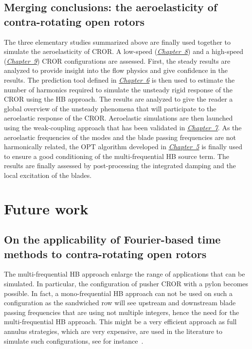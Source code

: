 \subsection*{Merging conclusions: the aeroelasticity of contra-rotating open rotors}

The three elementary studies summarized above 
are finally used together 
to simulate the aeroelasticity
of CROR. A low-speed 
(\hyperref[cha:dream_ls_isolated]{\emph{Chapter~8}})
and a high-speed (\hyperref[cha:dream_hs_isolated]{\emph{Chapter~9}})
CROR configurations are assessed. First,
the steady results are analyzed to provide insight into the flow
physics and give confidence in the results. The prediction tool
defined in \hyperref[cha:limitations_convergence]{\emph{Chapter~6}}
is then used to estimate the number of harmonics required to
simulate the unsteady rigid response of the CROR using the HB approach.
The results are analyzed
to give the reader a global overview of the unsteady phenomena
that will participate to the aeroelastic response of the CROR.
Aeroelastic simulations are then launched using the weak-coupling
approach that has been validated in \hyperref[cha:stcf11]{\emph{Chapter~7}}.
As the aeroelastic frequencies of the modes and the blade passing frequencies
are not harmonically related, the OPT algorithm developed in 
\hyperref[cha:limitations_condition_number]{\emph{Chapter~5}}
is finally used to ensure a good conditioning of the multi-frequential
HB source term. 
The results are finally assessed by post-processing the integrated damping
and the local excitation of the blades.

\section*{Future work}

\subsection*{On the applicability of Fourier-based time methods to contra-rotating open rotors}

The multi-frequential HB approach enlarge the range
of applications that can be simulated. In particular, 
the configuration of pusher CROR with a pylon becomes possible.
In fact, a mono-frequential HB approach can not be
used on such a configuration as the sandwiched row will see upstream
and downstream
blade passing frequencies that are using not multiple integers, hence
the need for the multi-frequential HB approach.
This might be a very efficient approach as full annulus
strategies, which are very expensive, 
are used in the literature to simulate such
configurations, see for instance~\citet{Stuermer2008}.

